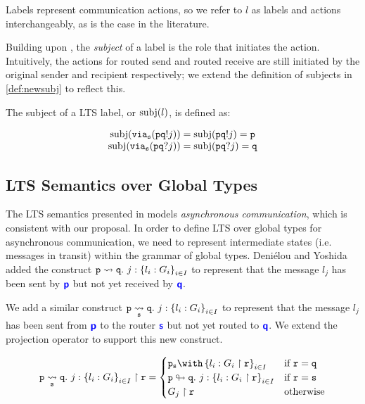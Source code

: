 Labels represent communication actions, so we refer
to $l$ as labels and actions interchangeably,
as is the case in the literature.

Building upon \cite{characterisation},
the \textit{subject} of a label is the role
that initiates the action. 
Intuitively, the actions for routed send and routed
receive are still initiated by the original sender and
recipient respectively;
we extend the definition
of subjects in \cref{def:newsubj} to reflect this.

\begin{definition}[Subject]
The subject of a LTS label, or $\subj{l}$, is defined as:

\doublespacing
\[
\begin{array}{c}
\subj{\via{s}{\aout{p}{q}{j}}} = 
	\subj{\aout{p}{q}{j}} = \mrole{p} \\
\subj{\via{s}{\ain{p}{q}{j}}} = 
	\subj{\ain{p}{q}{j}} = \mrole{q} \\
\end{array}
\]
\singlespacing
\label{def:newsubj}
\end{definition}

\subsection{LTS Semantics over Global Types}
\label{subsection:newltsglobal}

The LTS semantics presented in \cite{characterisation}
models \textit{asynchronous communication},
which is consistent with our proposal.
In order to define LTS over global types for
asynchronous communication, we need to
represent intermediate states (i.e. messages in transit)
within the grammar of global types.
Deni\'elou and Yoshida \cite{characterisation}
added the construct
{$\gtrans{p}{q}{j}{l_i: G_i}{i \in I}$}
to represent that the message $l_j$ has been
sent by $\role{p}$ but not yet received by $\role{q}$.

We add a similar construct
{$\gtransroute{p}{q}{s}{j}{l_i: G_i}{i \in I}$}
to represent that the message $l_j$ has
been sent from $\role{p}$ to the router $\role{s}$
but not yet routed to $\role{q}$.
We extend the projection operator to 
support this new construct.

\[
\proj{\gtransroute{p}{q}{s}{j}{l_i: G_i}{i \in I}}{r} = \begin{cases}
\tbraproxy{p}{s}{l_i: \proj{G_i}{r}}{i \in I} 
	& \text{if } \mrole{r} = \mrole{q} \\
\routertrans{p}{q}{j}{l_i: \proj{G_i}{r}}{i \in I}
	& \text{if } \mrole{r} = \mrole{s} \\
\proj{G_j}{r}
	& \text{otherwise} \\
\end{cases}
\]

